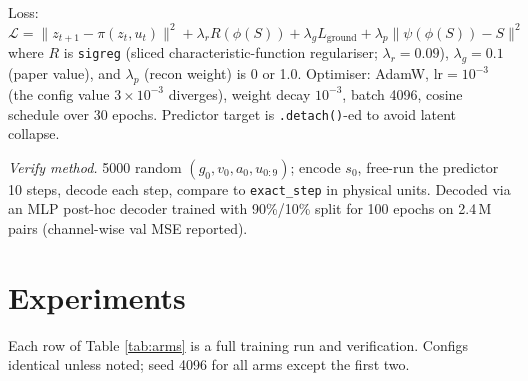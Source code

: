 \documentclass[11pt,a4paper]{article}
\begin{document}
Loss:
$\mathcal{L} = \|z_{t+1} - \pi(z_t, u_t)\|^2 + \lambda_r R(\phi(S)) + \lambda_g
L_{\text{ground}} + \lambda_p \|\psi(\phi(S)) - S\|^2$
where $R$ is \texttt{sigreg} (sliced characteristic-function regulariser;
$\lambda_r = 0.09$), $\lambda_g = 0.1$ (paper value), and $\lambda_p$ (recon
weight) is 0 or 1.0. Optimiser: AdamW, $\text{lr} = 10^{-3}$
(the config value $3\times 10^{-3}$ diverges), weight decay $10^{-3}$, batch
4096, cosine schedule over 30 epochs. Predictor target is
\texttt{.detach()}-ed to avoid latent collapse.

\emph{Verify method.} 5000 random $(g_0, v_0, a_0, u_{0:9})$; encode $s_0$,
free-run the predictor 10 steps, decode each step, compare to
\texttt{exact\_step} in physical units. Decoded via an MLP post-hoc decoder
trained with 90\%/10\% split for 100 epochs on 2.4\,M pairs (channel-wise
val MSE reported).

\section{Experiments}

Each row of Table \ref{tab:arms} is a full training run and verification.
Configs identical unless noted; seed 4096 for all arms except the first two.
\end{document}
